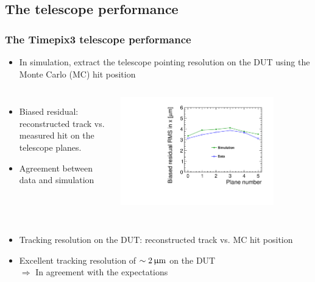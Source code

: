 \subsection{The telescope performance}
\begin{frame}
  \frametitle{}
  \tableofcontents[currentsubsection]
\end{frame}
\begin{frame}
  \frametitle{The Timepix3 telescope performance}

  \begin{itemize}
  \item In simulation, extract the telescope pointing resolution on
    the DUT using the Monte Carlo (MC) hit position
  \end{itemize}

  \begin{columns}
    \begin{itemize}
    \item Biased residual: reconstructed track vs. measured hit on the
      telescope planes.
    \item Agreement between data and simulation 
    \end{itemize}

    \centering
    \includegraphics[width=0.8\textwidth]{../figures/Telescope/biasedResiduals/RMSX_simu_vs_data.pdf}
  \end{columns}

  \begin{columns}
    \begin{itemize}
    \item Tracking resolution on the DUT: reconstructed track vs. MC
      hit position
    \item Excellent tracking resolution of
      \textcolor{Green}{$\sim2\,\upmu\mathrm{m}$} on the DUT
      \\
      $\Rightarrow$ In agreement with the expectations 
    \end{itemize}


\end{columns}
\end{frame}
